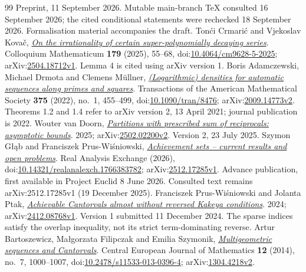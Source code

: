 \documentclass[11pt]{article}
\begin{document}
\begin{thebibliography}{99}
  Preprint, 11 September 2026. Mutable main-branch TeX consulted 16 September 2026; the cited conditional statements were rechecked 18 September 2026. Formalisation material accompanies the draft.
 Ton\'{c}i Crmari\'{c} and Vjekoslav Kova\v{c}, \href{https://arxiv.org/abs/2504.18712v1}{\emph{On the irrationality of certain super-polynomially decaying series}}.
  Colloquium Mathematicum \textbf{179} (2025), 55--68, doi:\href{https://doi.org/10.4064/cm9628-5-2025}{10.4064/cm9628-5-2025}; arXiv:\href{https://arxiv.org/abs/2504.18712v1}{2504.18712v1}. Lemma 4 is cited using arXiv version 1.
 Boris Adamczewski, Michael Drmota and Clemens M\"ullner, \href{https://arxiv.org/abs/2009.14773v2}{\emph{(Logarithmic) densities for automatic sequences along primes and squares}}.
  Transactions of the American Mathematical Society \textbf{375} (2022), no.~1, 455--499, doi:\href{https://doi.org/10.1090/tran/8476}{10.1090/tran/8476}; arXiv:\href{https://arxiv.org/abs/2009.14773v2}{2009.14773v2}. Theorems 1.2 and 1.4 refer to arXiv version 2, 13 April 2021; journal publication is 2022.
 Wouter van Doorn, \href{https://arxiv.org/abs/2502.02200v2}{\emph{Partitions with prescribed sum of reciprocals: asymptotic bounds}}.
  2025; arXiv:\href{https://arxiv.org/abs/2502.02200v2}{2502.02200v2}. Version 2, 23 July 2025. 
 Szymon G{\l}\k{a}b and Franciszek Prus-Wi\'sniowski, \href{https://arxiv.org/abs/2512.17285v1}{\emph{Achievement sets -- current results and open problems}}.
  Real Analysis Exchange (2026), doi:\href{https://doi.org/10.14321/realanalexch.1766383782}{10.14321/realanalexch.1766383782}; arXiv:\href{https://arxiv.org/abs/2512.17285v1}{2512.17285v1}. Advance publication, first available in Project Euclid 8 June 2026. Consulted text remains arXiv:2512.17285v1 (19 December 2025).
 Franciszek Prus-Wi\'sniowski and Jolanta Ptak, \href{https://arxiv.org/abs/2412.08768v1}{\emph{Achievable Cantorvals almost without reversed Kakeya conditions}}.
  2024; arXiv:\href{https://arxiv.org/abs/2412.08768v1}{2412.08768v1}. Version 1 submitted 11 December 2024. The sparse indices satisfy the overlap inequality, not its strict term-dominating reverse.
 Artur Bartoszewicz, Ma{\l}gorzata Filipczak and Emilia Szymonik, \href{https://arxiv.org/abs/1304.4218v2}{\emph{Multigeometric sequences and Cantorvals}}.
  Central European Journal of Mathematics \textbf{12} (2014), no.~7, 1000--1007, doi:\href{https://doi.org/10.2478/s11533-013-0396-4}{10.2478/s11533-013-0396-4}; arXiv:\href{https://arxiv.org/abs/1304.4218v2}{1304.4218v2}.

\end{thebibliography}
\end{document}
